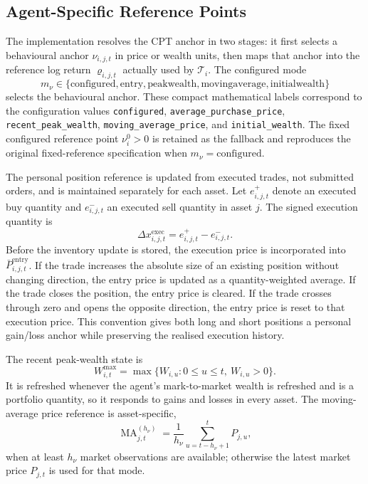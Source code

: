 \documentclass[12pt, a4paper]{article}
\DeclareMathOperator{\MA}{MA}
\begin{document}
    \subsection{Agent-Specific Reference Points}\label{sec:cpt_reference_points}

    The implementation resolves the CPT anchor in two stages: it first selects a
    behavioural anchor \(\nu_{i,j,t}\) in price or wealth units, then maps that
    anchor into the reference log return \(\varrho_{i,j,t}\) actually used by
    \(\mathcal{T}_i\). The configured mode
    \[
        m_{\nu}\in\{
        \mathrm{configured},
        \mathrm{entry},
        \mathrm{peakwealth},
        \mathrm{movingaverage},
        \mathrm{initialwealth}
        \}
    \]
    selects the behavioural anchor. These compact mathematical labels correspond
    to the configuration values \texttt{configured},
    \texttt{average\_purchase\_price}, \texttt{recent\_peak\_wealth},
    \texttt{moving\_average\_price}, and \texttt{initial\_wealth}. The fixed
    configured reference point \(\nu_i^0>0\) is retained as the fallback and
    reproduces the original fixed-reference specification when
    \(m_{\nu}=\mathrm{configured}\).

    The personal position reference is updated from executed trades, not submitted
    orders, and is maintained separately for each asset. Let \(e_{i,j,t}^{+}\)
    denote an executed buy quantity and \(e_{i,j,t}^{-}\) an executed sell quantity
    in asset \(j\). The signed execution quantity is
    \[
        \Delta x_{i,j,t}^{\mathrm{exec}}=e_{i,j,t}^{+}-e_{i,j,t}^{-}.
    \]
    Before the inventory update is stored, the execution price is incorporated into
    \(\bar P_{i,j,t}^{\text{entry}}\). If the trade increases the absolute size of an
    existing position without changing direction, the entry price is updated as a
    quantity-weighted average. If the trade closes the position, the entry price is
    cleared. If the trade crosses through zero and opens the opposite direction,
    the entry price is reset to that execution price. This convention gives both
    long and short positions a personal gain/loss anchor while preserving the
    realised execution history.

    The recent peak-wealth state is
    \[
        W_{i,t}^{\max}
        =\max\{W_{i,u}:0\le u\le t,\ W_{i,u}>0\}.
    \]
    It is refreshed whenever the agent's mark-to-market wealth is refreshed and is
    a portfolio quantity, so it responds to gains and losses in every asset. The
    moving-average price reference is asset-specific,
    \[
        \MA_{j,t}^{(h_{\nu})}
        =
        \frac{1}{h_{\nu}}\sum_{u=t-h_{\nu}+1}^{t}P_{j,u},
    \]
    when at least \(h_{\nu}\) market observations are available; otherwise the
    latest market price \(P_{j,t}\) is used for that mode.
\end{document}
